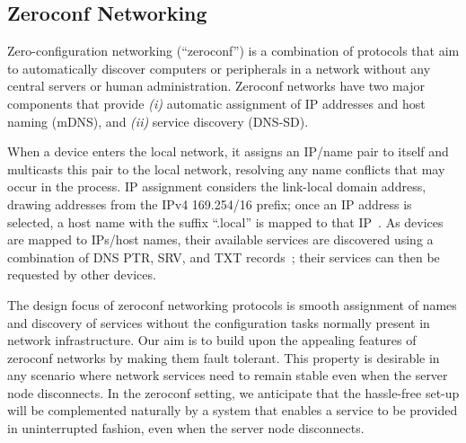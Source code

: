 \subsection{Zeroconf Networking}
\label{sub:background_zeroconf_networking}

Zero-configuration networking (``zeroconf'') is a combination of protocols that aim to automatically discover computers or peripherals in a network without any central servers or human administration. 
Zeroconf networks have two major components that provide {\it (i)} automatic assignment of IP addresses and host naming (mDNS), and {\it (ii)} service discovery (DNS-SD).

When a device enters the local network, it assigns an IP/name pair to itself and  multicasts this pair to the local network, resolving any name conflicts that may occur in the process. 
IP assignment considers the link-local domain address, drawing addresses from the IPv4 169.254/16 prefix; once an IP address is selected, a host name with the suffix ``.local'' is mapped to that IP~\cite{rfc6762}. 
As devices are mapped to IPs/host names, their available services are discovered using a combination of DNS PTR, SRV, and TXT records~\cite{rfc6763}; their services can then be requested by other devices.

The design focus of zeroconf networking protocols is smooth assignment of names and discovery of services without the configuration tasks normally present in network infrastructure.
Our aim is to build upon the appealing features of zeroconf networks by making them fault tolerant.
This property is desirable in any scenario where network services need to remain stable even when the server node disconnects.
In the zeroconf setting, we anticipate that the hassle-free set-up will be complemented naturally by a system that enables a service to be provided in uninterrupted fashion, even when the server node disconnects.
